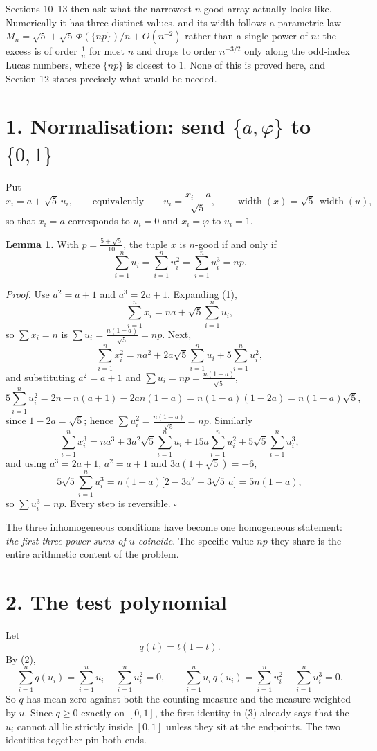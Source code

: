 \documentclass[12pt]{article}
\newcommand{\sumi}{\sum_{i=1}^{n}}
\newcommand{\W}{\operatorname{width}}
\begin{document}
Sections 10--13 then ask what the narrowest \(n\)-good array actually
looks like. Numerically it has three distinct values, and its width
follows a parametric law
\(M_n=\sqrt5+\sqrt5\,\Phi(\{np\})/n+O(n^{-2})\) rather than a single power
of \(n\): the excess is of order \(\frac1n\) for most \(n\) and drops to
order \(n^{-3/2}\) only along the odd-index Lucas numbers, where
\(\{np\}\) is closest to \(1\). None of this is proved here, and Section
12 states precisely what would be needed.

\section*{1. Normalisation: send \(\{a,\varphi\}\) to \(\{0,1\}\)}

Put
\[
x_i=a+\sqrt5\,u_i,
\qquad\text{equivalently}\qquad
u_i=\frac{x_i-a}{\sqrt5},
\qquad
\W(x)=\sqrt5\,\W(u),
\tag{1}
\]
so that \(x_i=a\) corresponds to \(u_i=0\) and \(x_i=\varphi\) to
\(u_i=1\).

\textbf{Lemma 1.} With \(p=\frac{5+\sqrt5}{10}\), the tuple \(x\) is
\(n\)-good if and only if
\[
\boxed{\displaystyle \sumi u_i=\sumi u_i^2=\sumi u_i^3=np .}
\tag{2}
\]

\textit{Proof.} Use \(a^2=a+1\) and \(a^3=2a+1\). Expanding (1),
\[
\sumi x_i=na+\sqrt5\sumi u_i,
\]
so \(\sum x_i=n\) is \(\sum u_i=\frac{n(1-a)}{\sqrt5}=np\). Next,
\[
\sumi x_i^2=na^2+2a\sqrt5\sumi u_i+5\sumi u_i^2 ,
\]
and substituting \(a^2=a+1\) and \(\sum u_i=np=\frac{n(1-a)}{\sqrt5}\),
\[
5\sumi u_i^2=2n-n(a+1)-2an(1-a)=n(1-a)(1-2a)=n(1-a)\sqrt5,
\]
since \(1-2a=\sqrt5\); hence \(\sum u_i^2=\frac{n(1-a)}{\sqrt5}=np\).
Similarly
\[
\sumi x_i^3=na^3+3a^2\sqrt5\sumi u_i+15a\sumi u_i^2+5\sqrt5\sumi u_i^3 ,
\]
and using \(a^3=2a+1\), \(a^2=a+1\) and \(3a(1+\sqrt5)=-6\),
\[
5\sqrt5\sumi u_i^3=n(1-a)\bigl[2-3a^2-3\sqrt5\,a\bigr]=5n(1-a),
\]
so \(\sum u_i^3=np\). Every step is reversible. \(\square\)

The three inhomogeneous conditions have become one homogeneous statement:
\emph{the first three power sums of \(u\) coincide}. The specific value
\(np\) they share is the entire arithmetic content of the problem.

\section*{2. The test polynomial}

Let
\[
q(t)=t(1-t).
\]
By (2),
\[
\sumi q(u_i)=\sumi u_i-\sumi u_i^2=0,
\qquad
\sumi u_i\,q(u_i)=\sumi u_i^2-\sumi u_i^3=0 .
\tag{3}
\]
So \(q\) has mean zero against both the counting measure and the measure
weighted by \(u\). Since \(q\ge0\) exactly on \([0,1]\), the first
identity in (3) already says that the \(u_i\) cannot all lie strictly
inside \([0,1]\) unless they sit at the endpoints. The two identities
together pin both ends.
\end{document}
